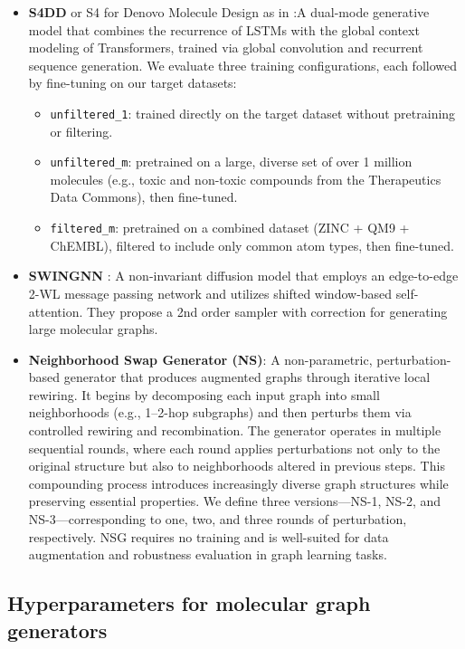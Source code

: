 \begin{itemize}
    \item \textbf{S4DD} or S4 for Denovo Molecule Design as in \cite{ozcelik2024s4}:A dual-mode generative model that combines the recurrence of LSTMs with the global context modeling of Transformers, trained via global convolution and recurrent sequence generation. We evaluate three training configurations, each followed by fine-tuning on our target datasets:
\begin{itemize}
    \item \texttt{unfiltered\_1}: trained directly on the target dataset without pretraining or filtering.
    \item \texttt{unfiltered\_m}: pretrained on a large, diverse set of over 1 million molecules (e.g., toxic and non-toxic compounds from the Therapeutics Data Commons), then fine-tuned.
    \item \texttt{filtered\_m}: pretrained on a combined dataset (ZINC + QM9 + ChEMBL), filtered to include only common atom types, then fine-tuned.
    
\end{itemize}
    \item \textbf{SWINGNN} \cite{yan2023swingnn}: A non-invariant diffusion model that employs an edge-to-edge 2-WL message passing network and utilizes shifted window-based self-attention. They propose a 2nd order sampler with correction for generating large molecular graphs.

    \item \textbf{Neighborhood Swap Generator (NS)}: A non-parametric, perturbation-based generator that produces augmented graphs through iterative local rewiring. It begins by decomposing each input graph into small neighborhoods (e.g., 1--2-hop subgraphs) and then perturbs them via controlled rewiring and recombination. The generator operates in multiple sequential rounds, where each round applies perturbations not only to the original structure but also to neighborhoods altered in previous steps. This compounding process introduces increasingly diverse graph structures while preserving essential properties. We define three versions---NS-1, NS-2, and NS-3---corresponding to one, two, and three rounds of perturbation, respectively. NSG requires no training and is well-suited for data augmentation and robustness evaluation in graph learning tasks.
\end{itemize}

\subsection{Hyperparameters for molecular graph generators}
\label{appendix:hyperparameters_for_molecular}

